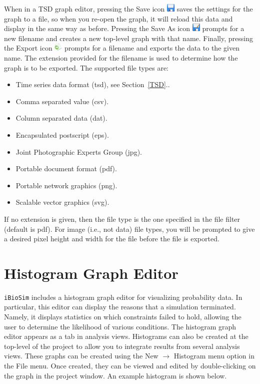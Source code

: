 \documentclass[titlepage,11pt]{article}
\begin{document}
When in a TSD graph editor, pressing the Save icon \includegraphics{../gui/icons/save} saves the settings for the graph to a file, so when you re-open the graph, it will reload this data and display in the same way as before.  Pressing the Save As icon \includegraphics{../gui/icons/saveas} prompts for a new filename and creates a new top-level graph with that name.  Finally, pressing the Export icon \includegraphics{../gui/icons/export} prompts for a filename and exports the data to the given name.  The extension provided for the filename is used to determine how the graph is to be exported. The supported file types are: 
\begin{itemize}
\item Time series data format (tsd), see Section~\ref{TSD}..
\item Comma separated value (csv).
\item Column separated data (dat).
\item Encapsulated postscript (eps). 
\item Joint Photographic Experts Group (jpg). 
\item Portable document format (pdf).
\item Portable network graphics (png). 
\item Scalable vector graphics (svg).
\end{itemize}
If no extension is given, then the file type is the one specified in the file filter (default is pdf).  For image (i.e.,
not data) file types, you will be prompted to give a desired pixel height and width for the file before the file is exported. 

\clearpage

\section{\label{Histogram}Histogram Graph Editor}

\noindent
{\tt iBioSim} includes a histogram graph editor for visualizing probability data.  In particular, this editor can display the reasons that a simulation terminated.  Namely, it displays statistics on which constraints failed to hold, allowing the user to determine the likelihood of various conditions.  The histogram graph editor appears as a tab in analysis
views.  Histograms can also be created at the top-level of the project to allow you to integrate results from several analysis views.  These graphs can be created using the New $\rightarrow$ Histogram menu option in the File menu. Once created, they can be viewed and edited by double-clicking on the graph in the project window.  An example histogram is shown below.
\end{document}
